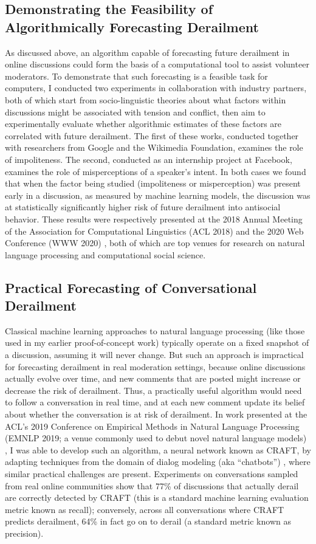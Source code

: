 \documentclass[11pt,letterpaper]{article}
\begin{document}
\subsection{Demonstrating the Feasibility of Algorithmically Forecasting Derailment}
As discussed above, an algorithm capable of forecasting future derailment in online discussions could form the basis of a computational tool to assist volunteer moderators.
To demonstrate that such forecasting is a feasible task for computers, I conducted two experiments in collaboration with industry partners, both of which start from socio-linguistic theories about what factors within discussions might be associated with tension and conflict, then aim to experimentally evaluate whether algorithmic estimates of these factors are correlated with future derailment.
The first of these works, conducted together with researchers from Google and the Wikimedia Foundation, examines the role of impoliteness.
The second, conducted as an internship project at Facebook, examines the role of misperceptions of a speaker's intent.
In both cases we found that when the factor being studied (impoliteness or misperception) was present early in a discussion, as measured by machine learning models, the discussion was at statistically significantly higher risk of future derailment into antisocial behavior.
These results were respectively presented at the 2018 Annual Meeting of the Association for Computational Linguistics (ACL 2018) \cite{zhang_conversations_2018} and the 2020 Web Conference (WWW 2020) \cite{chang_dont_2020}, both of which are top venues for research on natural language processing and computational social science.

\subsection{Practical Forecasting of Conversational Derailment}
Classical machine learning approaches to natural language processing (like those used in my earlier proof-of-concept work) typically operate on a fixed snapshot of a discussion, assuming it will never change.
But such an approach is impractical for forecasting derailment in real moderation settings, because online discussions actually evolve over time, and new comments that are posted might increase or decrease the risk of derailment.
Thus, a practically useful algorithm would need to follow a conversation in real time, and at each new comment update its belief about whether the conversation is at risk of derailment.
In work presented at the ACL's 2019 Conference on Empirical Methods in Natural Language Processing (EMNLP 2019; a venue commonly used to debut novel natural language models) \cite{chang_trouble_2019}, I was able to develop such an algorithm, a neural network known as CRAFT, by adapting techniques from the domain of dialog modeling (aka ``chatbots'') \cite{serban_building_2016}, where similar practical challenges are present.
Experiments on conversations sampled from real online communities show that 77\% of discussions that actually derail are correctly detected by CRAFT (this is a standard machine learning evaluation metric known as recall); conversely, across all conversations where CRAFT predicts derailment, 64\% in fact go on to derail (a standard metric known as precision).
\end{document}
